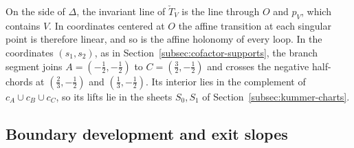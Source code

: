 On the side of $\Delta$, the invariant line of $\check T_V$ is the line
through $O$ and $p_V$, which contains $V$.  In coordinates centered at $O$
the affine transition at each singular point is therefore linear, and so is
the affine holonomy of every loop.  In the coordinates $(s_1,s_2)$, as in
Section~\ref{subsec:cofactor-supports}, the branch segment joins
$A=(-\frac12,-\frac12)$ to $C=(\frac32,-\frac12)$ and crosses the negative
half-chords at $(\frac23,-\frac12)$ and $(\frac13,-\frac12)$.  Its
interior lies in the complement of $c_A\cup c_B\cup c_C$, so its lifts lie
in the sheets $S_0,S_1$ of Section~\ref{subsec:kummer-charts}.

\subsection{Boundary development and exit slopes}

